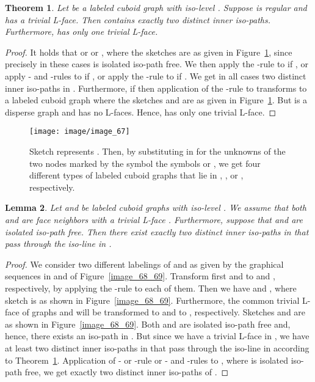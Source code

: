 \documentclass[a4paper,11pt]{article}
\newtheorem{theorem}{Theorem}[section]
\newtheorem{lemma}[theorem]{Lemma}
\begin{document}
\begin{theorem}\label{thm:connect-1}
Let  be a labeled cuboid graph with iso-level . Suppose  is regular
and has a trivial L-face. Then  contains exactly two distinct inner iso-paths. Furthermore,  has
only one trivial L-face.
\end{theorem}
\begin{proof} It holds that  or  or ,
where the sketches  are as given in Figure~\ref{image_67}, since precisely in these cases
 is isolated iso-path free. We then apply the -rule to  if ,
or apply - and -rules to  if , or apply the -rule to  if
. We get in all cases two distinct inner iso-paths in . Furthermore, if
 then application of the -rule to  transforms  to a labeled cuboid
graph  where the sketches  and  are as given in
Figure~\ref{image_67}. But  is a disperse graph and has no L-faces. Hence,  has only one trivial
L-face.
\end{proof}
\begin{figure}[!ht]
\texttt{[image: image/image\_67]}
\caption{Sketch  represents . Then, by substituting in  for the
unknowns of the two nodes marked by the symbol  the symbols
 or , we get four different types of labeled cuboid graphs that lie in
, ,  or , respectively.}
\label{image_67}
\end{figure}
\FloatBarrier
\begin{lemma}\label{lemma:connect-1}
Let  and  be labeled cuboid graphs with
iso-level . We assume that both  and  are face neighbors with a trivial
L-face . Furthermore, suppose that  and  are isolated iso-path
free. Then there exist exactly two distinct inner iso-paths in  that pass through the iso-line
in .
\end{lemma}
\begin{proof} We consider two different labelings of  and
 as given by the graphical sequences in  and  of
Figure~\ref{image_68_69}. Transform first  and  to  and
, respectively, by applying the -rule to each of
them. Then we have  and , where sketch  is as
shown in Figure~\ref{image_68_69}. Furthermore, the common trivial L-face of graphs  and
 will be transformed to  and
to , respectively. Sketches
 and  are as shown in Figure~\ref{image_68_69}. Both  and  are isolated iso-path
free and, hence, there exists an iso-path in . But since we have a trivial L-face in ,
we have at least two distinct inner iso-paths in  that pass through the iso-line in  according
to Theorem~\ref{thm:connect-1}. Application of - or -rule or - and -rules
to , where  is isolated iso-path free, we get exactly two distinct inner
iso-paths of .
\end{proof}
\end{document}
